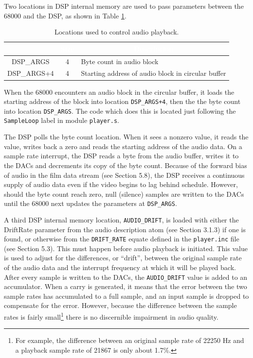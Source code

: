 \documentclass[12pt,letterpaper,twoside]{article}
\newcommand{\tabheadtxt}[1]{\multicolumn{1}{c}{\textcolor{white}{\textbf{#1}}}}
\begin{document}
Two locations in DSP internal memory are used to pass parameters between the 68000 and the DSP, as shown in Table \ref{tab:dspparams}.

\begin{table}[h]
\centering
\begin{tabular}{|c|c|p{10cm}|}
\hline
\rowcolor{black}
\tabheadtxt{Location} & \tabheadtxt{Size} & \tabheadtxt{Description} \\
\hline
DSP\_ARGS & 4 & Byte count in audio block \\
\hline
DSP\_ARGS+4 & 4 & Starting address of audio block in circular buffer \\
\hline
\end{tabular}
\caption{Locations used to control audio playback.}
\label{tab:dspparams}
\end{table}
\FloatBarrier

When the 68000 encounters an audio block in the circular buffer, it loads the starting address of the block into location \texttt{DSP\_ARGS+4}, then the the byte count into location \texttt{DSP\_ARGS}. The code which does this is located just following the \texttt{SampleLoop} label in module \texttt{player.s}.

The DSP polls the byte count location. When it sees a nonzero value, it reads the value, writes back a zero and reads the starting address of the audio data. On a sample rate interrupt, the DSP reads a byte from the audio buffer, writes it to the DACs and decrements its copy of the byte count. Because of the forward bias of audio in the film data stream (see Section 5.8), the DSP receives a continuous supply of audio data even if the video begins to lag behind schedule. However, should the byte count reach zero, null (silence) samples are written to the DACs until the 68000 next updates the parameters at \texttt{DSP\_ARGS}.

A third DSP internal memory location, \texttt{AUDIO\_DRIFT}, is loaded with either the DriftRate parameter from the audio description atom (see Section 3.1.3) if one is found, or otherwise from the \texttt{DRIFT\_RATE} equate defined in the \texttt{player.inc} file (see Section 5.3). This must happen before audio playback is initiated. This value is used to adjust for the differences, or ``drift'', between the original sample rate of the audio data and the interrupt frequency at which it will be played back. After every sample is written to the DACs, the \texttt{AUDIO\_DRIFT} value is added to an accumulator. When a carry is generated, it means that the error between the two sample rates has accumulated to a full sample, and an input sample is dropped to compensate for the error. However, because the difference between the sample rates is fairly small\footnote{For example, the difference between an original sample rate of 22250 Hz and a playback sample rate of 21867 is only about 1.7\%.} there is no discernible impairment in audio quality.
\end{document}
